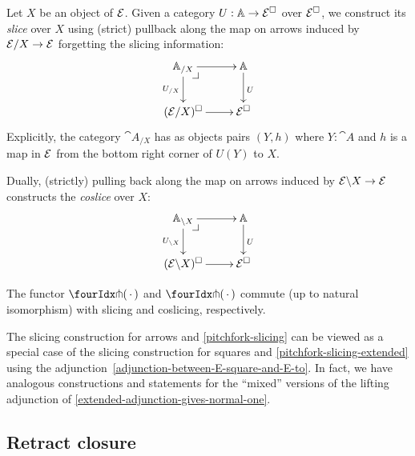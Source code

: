 \documentclass[reqno,10pt,a4paper,oneside]{amsart}
\begin{document}
Let $X$ be an object of $\mathcal{E}$.
Given a category $U : \mathbb{A} \to \mathcal{E}^{\Box}$ over $\mathcal{E}^{\Box}$, we construct its \emph{slice} over $X$ using (strict) pullback along the map on arrows induced by $\mathcal{E}/X \to \mathcal{E}$ forgetting the slicing information:
\[
\xymatrix{
  \cat{A}_{/X}
  \ar[r]
  \ar[d]_{U_{/X}}
  \pullback{dr}
&
  \cat{A}
  \ar[d]^{U}
\\
  (\catE/X)^{\Box}
  \ar[r]
&
  \catE^{\Box}
}
\]
Explicitly, the category $\cat{A}_{/X}$ has as objects pairs $(Y, h)$ where $Y : \cat{A}$ and $h$ is a map in $\mathcal{E}$ from the bottom right corner of $U(Y)$ to $X$.

Dually, (strictly) pulling back along the map on arrows induced by $\mathcal{E} \backslash X \to \mathcal{E}$ constructs the \emph{coslice} over $X$:
\[
\xymatrix{
  \cat{A}_{\backslash X}
  \ar[r]
  \ar[d]_{U_{\backslash X}}
  \pullback{dr}
&
  \cat{A}
  \ar[d]^{U}
\\
  (\catE \backslash X)^{\Box}
  \ar[r]
&
  \catE^{\Box}
}
\]

\begin{lemma}
\label{pitchfork-slicing-extended}
The functor $\liftr{\brarghole}$ and $\liftl{\brarghole}$ commute (up to natural isomorphism) with slicing and coslicing, respectively.
\end{lemma}

\begin{remark}
\label{slicing-mixed}
The slicing construction for arrows and \cref{pitchfork-slicing} can be viewed as a special case of the slicing construction for squares and \cref{pitchfork-slicing-extended} using the adjunction~\eqref{adjunction-between-E-square-and-E-to}.
In fact, we have analogous constructions and statements for the ``mixed'' versions of the lifting adjunction of \cref{extended-adjunction-gives-normal-one}.
\end{remark}

\subsection{Retract closure}
\end{document}
